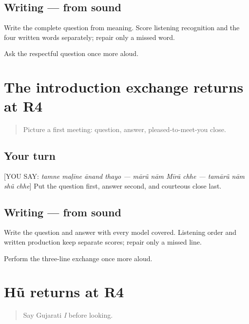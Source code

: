 \subsection*{Writing — from sound}
Write the complete question from meaning. Score listening recognition and the four written words separately; repair only a missed word.

\begin{tcolorbox}[breakable,colback=teal!4,colframe=teal!35!black,title={Before you move on}]
Ask the respectful question once more aloud.
\end{tcolorbox}
\section[Practice]{The introduction exchange returns at R4}

\label{lesson:GU-R17-introduction-r4}



\begin{quote}
Picture a first meeting: question, answer, pleased-to-meet-you close.
\end{quote}

\subsection*{Your turn}
{[}YOU SAY: \emph{tamne maḷīne ānand thayo — mārũ nām Mīrā chhe — tamārũ nām shũ chhe}{]} Put the question first, answer second, and courteous close last.

\subsection*{Writing — from sound}
Write the question and answer with every model covered. Listening order and written production keep separate scores; repair only a missed line.

\begin{tcolorbox}[breakable,colback=teal!4,colframe=teal!35!black,title={Before you move on}]
Perform the three-line exchange once more aloud.
\end{tcolorbox}
\section[Practice]{Hũ returns at R4}

\label{lesson:GU-R17-hun-r4}



\begin{quote}
Say Gujarati \emph{I} before looking.
\end{quote}


